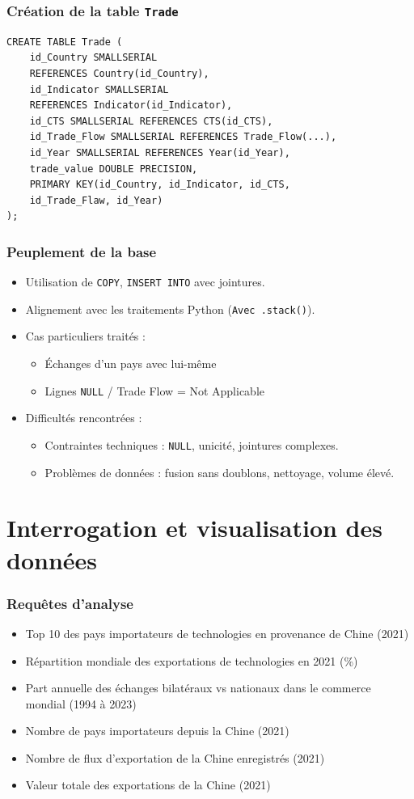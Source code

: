 \documentclass[11pt]{beamer}
\begin{document}
\begin{frame}[fragile]
  \frametitle{Création de la table \texttt{Trade}}
\begin{verbatim}
CREATE TABLE Trade (
    id_Country SMALLSERIAL 
    REFERENCES Country(id_Country),
    id_Indicator SMALLSERIAL 
    REFERENCES Indicator(id_Indicator),
    id_CTS SMALLSERIAL REFERENCES CTS(id_CTS),
    id_Trade_Flow SMALLSERIAL REFERENCES Trade_Flow(...),
    id_Year SMALLSERIAL REFERENCES Year(id_Year),
    trade_value DOUBLE PRECISION,
    PRIMARY KEY(id_Country, id_Indicator, id_CTS, 
    id_Trade_Flaw, id_Year)
);
\end{verbatim}
\end{frame}


\begin{frame}
  \frametitle{Peuplement de la base}
  \begin{itemize}
    \item<1-> Utilisation de \texttt{COPY}, \texttt{INSERT INTO} avec jointures.
    \item<1-> Alignement avec les traitements Python (\texttt{Avec .stack()}).
    \item<1-> Cas particuliers traités : 
      \begin{itemize}
        \item Échanges d’un pays avec lui-même
        \item Lignes \texttt{NULL} / Trade Flow = Not Applicable
      \end{itemize}
    \item<2-> Difficultés rencontrées :
    	\begin{itemize}
  			\item Contraintes techniques : \texttt{NULL}, unicité, jointures complexes.
  			\item Problèmes de données : fusion sans doublons, nettoyage, volume élevé.
		\end{itemize}
    \end{itemize}
\end{frame}

\section{Interrogation et visualisation des données}
\begin{frame}
  \frametitle{Requêtes d’analyse}
  \begin{itemize}
    \item Top 10 des pays importateurs de technologies en provenance de Chine (2021)
    \item Répartition mondiale des exportations de technologies en 2021 (\%)
    \item Part annuelle des échanges bilatéraux vs nationaux dans le commerce mondial (1994 à 2023)
    \item Nombre de pays importateurs depuis la Chine (2021)
    \item Nombre de flux d’exportation de la Chine enregistrés (2021)
    \item Valeur totale des exportations de la Chine (2021)
  \end{itemize}
\end{frame}
\end{document}
